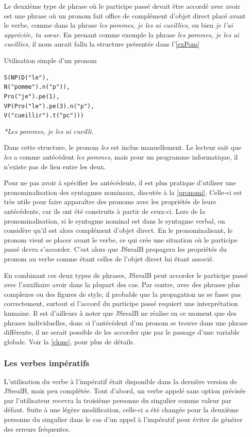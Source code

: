 \documentclass[11pt]{article} %
\newcommand{\system}[1]{\textsf{#1}}
\newcommand{\JSB}{\system{JSrealB}}
\newcommand{\real}[1]{\emph{#1}}
\begin{document}
Le deuxième type de phrase où le participe passé devait être accordé
avec avoir est une phrase où un pronom fait office de complément d'objet
direct placé avant le verbe, comme dans la phrase \emph{les pommes,
je les ai cueillies, }ou bien \emph{je l'ai appréciée, ta soeur. }En
prenant comme exemple la phrase \emph{les pommes, je les ai cueillies,
}il nous aurait fallu la structure présentée dans l'\autoref{exPom}
\begin{example}
\caption{Utilisation simple d'un pronom}
\begin{alltt}
S(NP(D("le"),
     N("pomme").n("p")),
  Pro("je").pe(1),
  VP(Pro("le").pe(3).n("p"),
     V("cueillir").t("pc")))
\end{alltt}
\real{*Les pommes, je les ai cueilli.}
\label{exPom}
\end{example}

Dans cette structure, le pronom \emph{les} est inclus manuellement.
Le lecteur sait que \emph{les} a comme antécédent \emph{les pommes},
mais pour un programme informatique, il n'existe pas de lien entre
les deux. 

Pour ne pas avoir à spécifier les antécédents, il est
plus pratique d'utiliser une pronominalisation des syntagmes
nominaux, discutée à la \autoref{pronomi}. Celle-ci est très utile pour
faire apparaître des pronoms avec les propriétés de leurs
antécédents, car ils ont été construits à partir de ceux-ci. Lors
de la pronominalisation, si le syntagme nominal est dans le syntagme
verbal, on considère qu'il est alors complément d'objet direct. En
le pronominalisant, le pronom vient se placer avant le verbe, ce qui
crée une situation où le participe passé devra s'accorder. C'est alors
que \JSB{} propagera les propriétés du pronom au verbe comme étant
celles de l'objet direct lui étant associé.

En combinant ces deux types de phrases, \JSB{} peut
accorder le participe passé avec l'auxiliaire avoir dans
la plupart des cas. Par contre, avec
des phrases plus complexes ou des figures de style, il probable que
la propagation ne se fasse pas correctement, surtout si l'accord du
participe passé requiert une interprétation humaine. Il
est d'ailleurs à noter que \JSB{} ne réalise en ce moment que des
phrases individuelles, donc si l'antécédent d'un pronom se trouve
dans une phrase différente, il ne serait possible de les accorder que
par le passage d'une variable globale. Voir la \autoref{clone}, pour plus de détails.


\subsubsection{Les verbes impératifs}
\label{imperatif}
L'utilisation du verbe à l'impératif était disponible dans la dernière
version de \JSB{}, mais peu complétée. Tout d'abord, un verbe appelé
sans option précisée par l'utilisateur recevra la troisième personne
du singulier comme valeur par défaut. Suite à une légère modification,
celle-ci a été changée pour la deuxième personne du singulier dans
le cas d'un appel à l'impératif pour éviter de générer des erreurs
fréquentes.
\end{document}
